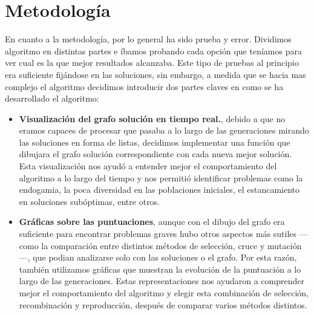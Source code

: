 \documentclass[12pt,a4paper]{report}
\begin{document}
\section{Metodología}
    En cuanto a la metodología, por lo general ha sido prueba y error. Dividimos algoritmo en distintas partes e íbamos probando cada opción que teníamos para ver cual es la que mejor resultados alcanzaba.
    Este tipo de pruebas al principio era suficiente fijándose en las soluciones, sin embargo, a medida que se hacia mas complejo el algoritmo decidimos introducir dos partes claves en como se ha desarrollado el algoritmo:
    \begin{itemize}
        \item \textbf{Visualización del grafo solución en tiempo real.}, debido a que no eramos capaces de procesar que pasaba a lo largo de las generaciones mirando las soluciones en forma de listas, decidimos implementar una función que dibujara el grafo solución correspondiente con cada nueva mejor solución. Esta visualización nos ayudó a entender mejor el comportamiento del algoritmo a lo largo del tiempo y nos permitió identificar problemas como la endogamia, la poca diversidad en las poblaciones iniciales, el estancamiento en soluciones subóptimas, entre otros.
        \item \textbf{Gráficas sobre las puntuaciones}, aunque con el dibujo del grafo era suficiente para encontrar problemas graves hubo otros aspectos más sutiles —como la comparación entre distintos métodos de selección, cruce y mutación—, que podian analizarse solo con las soluciones o el grafo. Por esta razón, también utilizamos gráficas que muestran la evolución de la puntuación a lo largo de las generaciones. Estas representaciones nos ayudaron a comprender mejor el comportamiento del algoritmo y elegir esta combinación de selección, recombinación y reproducción, después de comparar varios métodos distintos.
    \end{itemize}
\end{document}
